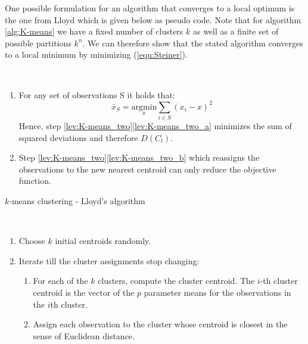 One possible formulation for an algorithm that converges to a local optimum is the one from Lloyd \cite{lloyd1982least} which is given below as pseudo code. Note that for algorithm \ref{alg:K-means} we have a fixed number of clusters $k$ as well as a finite set of possible partitions $k^n$. We can therefore show that the stated algorithm converges to a local minimum by minimizing (\ref{equ:Steiner}).

\begin{remark}~
	\begin{enumerate}[label=(\roman*)]
		\item For any set of observations S it holds that: 
			\begin{equation*}
				\bar x_S = \underset{x}{\text{argmin}}\sum_{i \in S} (x_i - x)^2
			\end{equation*}
			Hence, step \ref{lev:K-means_two}\ref{lev:K-means_two_a} minimizes the sum of squared deviations and therefore $D(C_l)$.
		\item Step \ref{lev:K-means_two}\ref{lev:K-means_two_b} which reassigns the observations to the new nearest centroid can only reduce the objective function.
	\end{enumerate}
\end{remark}

	
\begin{algorithm}
	\caption{$k$-means clustering \cite{Introducion_Stat_Learning} - Lloyd's algorithm}\label{alg:K-means}
\begin{algorithmic}
\\
	\begin{enumerate}
	\item Choose $k$ initial centroids randomly.
	\item  \label{lev:K-means_two}Iterate till the cluster assignments stop changing:
	\begin{enumerate}[label=\emph{\alph*})]
		\item \label{lev:K-means_two_a} For each of the $k$ clusters, compute the cluster centroid. The $i$-th cluster centroid is the vector of the $p$ parameter means for the observations in the $i$th cluster. 
		\item \label{lev:K-means_two_b}Assign each observation to the cluster whose centroid is closest in the sense of Euclidean distance. 
	\end{enumerate}
	\end{enumerate}
\end{algorithmic}
\end{algorithm}

